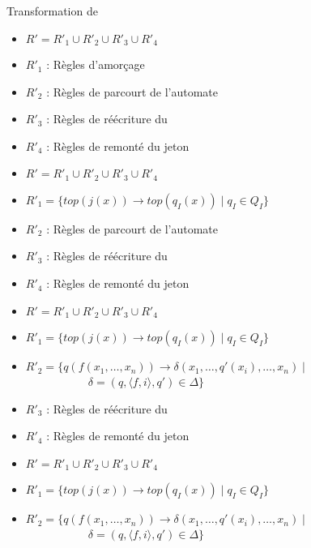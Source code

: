 \begin{frame}{Transformation de \pctrs}
  \begin{overprint}
    \begin{itemize}
    \item $R' = R'_1 \cup R'_2 \cup R'_3 \cup R'_4$
    \item $R'_1$ : Règles d'amorçage
    \item $R'_2$ : Règles de parcourt de l'automate
    \item $R'_3$ : Règles de réécriture du \pctrs
    \item $R'_4$ : Règles de remonté du jeton
    \end{itemize}
    \begin{itemize}
    \item $R' = R'_1 \cup R'_2 \cup R'_3 \cup R'_4$
    \item $R'_1 = \{top(j(x)) \rightarrow top(q_I(x)) \mid q_I \in Q_I\}$
    \item $R'_2$ : Règles de parcourt de l'automate
    \item $R'_3$ : Règles de réécriture du \pctrs
    \item $R'_4$ : Règles de remonté du jeton
    \end{itemize}
    \begin{itemize}
    \item $R' = R'_1 \cup R'_2 \cup R'_3 \cup R'_4$
    \item $R'_1 = \{top(j(x)) \rightarrow top(q_I(x)) \mid q_I \in Q_I\}$
    \item $R'_2 = \{q(f(x_1,\ldots,x_n))\rightarrow \delta(x_1,\ldots,q'(x_i),\ldots,x_n) \mid$\\
      ~~~~~~~~~~~$\delta=(q, \langle f,i \rangle, q') \in \Delta\}$
    \item $R'_3$ : Règles de réécriture du \pctrs
    \item $R'_4$ : Règles de remonté du jeton
    \end{itemize}
    \begin{itemize}
    \item $R' = R'_1 \cup R'_2 \cup R'_3 \cup R'_4$
    \item $R'_1 = \{top(j(x)) \rightarrow top(q_I(x)) \mid q_I \in Q_I\}$
    \item $R'_2 = \{q(f(x_1,\ldots,x_n))\rightarrow \delta(x_1,\ldots,q'(x_i),\ldots,x_n) \mid$\\
      ~~~~~~~~~~~$\delta=(q, \langle f,i \rangle, q') \in \Delta\}$

\end{itemize}
\end{overprint}
\end{frame}
